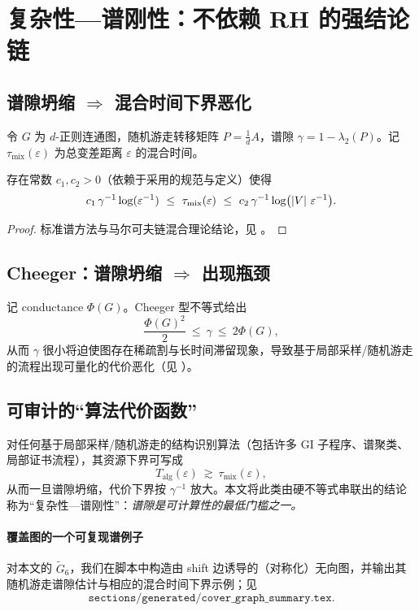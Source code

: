 \section{复杂性—谱刚性：不依赖 RH 的强结论链}\label{sec:complexity}

\subsection{谱隙坍缩 $\Rightarrow$ 混合时间下界恶化}
令 $G$ 为 $d$-正则连通图，随机游走转移矩阵 $P=\tfrac1dA$，谱隙 $\gamma=1-\lambda_2(P)$。记 $\tau_{\mathrm{mix}}(\varepsilon)$ 为总变差距离 $\varepsilon$ 的混合时间。

\begin{theorem}[谱隙—混合时间基本界]\label{thm:mixing-gap}
存在常数 $c_1,c_2>0$（依赖于采用的规范与定义）使得
\[
  c_1\,\gamma^{-1}\log(\varepsilon^{-1})\ \le\ \tau_{\mathrm{mix}}(\varepsilon)\ \le\ c_2\,\gamma^{-1}\log\bigl(\abs{V}\,\varepsilon^{-1}\bigr).
\]
\end{theorem}
\begin{proof}
标准谱方法与马尔可夫链混合理论结论，见 \cite{levinpereswilmer,lovasz1993randomwalks}。
\end{proof}

\subsection{Cheeger：谱隙坍缩 $\Rightarrow$ 出现瓶颈}
记 conductance $\Phi(G)$。Cheeger 型不等式给出
\[
  \frac{\Phi(G)^2}{2}\ \le\ \gamma\ \le\ 2\Phi(G),
\]
从而 $\gamma$ 很小将迫使图存在稀疏割与长时间滞留现象，导致基于局部采样/随机游走的流程出现可量化的代价恶化（见 \cite{lmspectralsgapnotes}）。

\subsection{可审计的“算法代价函数”}
对任何基于局部采样/随机游走的结构识别算法（包括许多 GI 子程序、谱聚类、局部证书流程），其资源下界可写成
\[
  T_{\mathrm{alg}}(\varepsilon)\ \gtrsim\ \tau_{\mathrm{mix}}(\varepsilon),
\]
从而一旦谱隙坍缩，代价下界按 $\gamma^{-1}$ 放大。本文将此类由硬不等式串联出的结论称为“复杂性—谱刚性”：\emph{谱隙是可计算性的最低门槛之一。}

\paragraph{覆盖图的一个可复现谱例子}
对本文的 $\widetilde G_6$，我们在脚本中构造由 shift 边诱导的（对称化）无向图，并输出其随机游走谱隙估计与相应的混合时间下界示例；见
\[
  \texttt{sections/generated/cover\_graph\_summary.tex}.
\]

